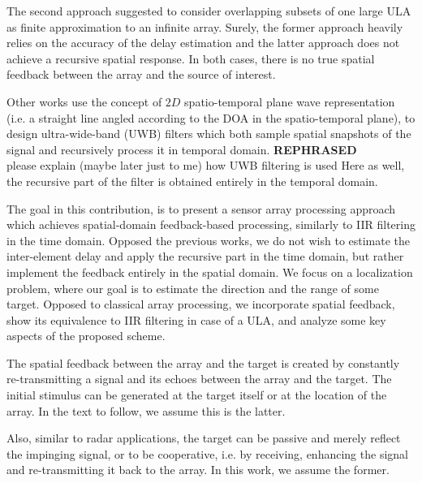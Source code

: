 The second approach suggested to consider overlapping subsets of one large ULA as finite approximation to an infinite array. Surely, the former approach heavily relies on the accuracy of the delay estimation and the latter approach does not achieve a recursive spatial response. In both cases, there is no true spatial feedback between the array and the source of interest.
\par Other works \cite{Madanayake2008AFilters,Madanayake2008ABeamformer} use the concept of $2D$ spatio-temporal plane wave representation (i.e. a straight line angled according to the DOA in the spatio-temporal plane), to design ultra-wide-band (UWB) filters \cite{L.Bruton1983HighlyPlanes} which both sample spatial snapshots of the signal and recursively process it in temporal domain.  {\textbf{REPHRASED}\\please explain (maybe later just to me) how UWB filtering is used}
Here as well, the recursive part of the filter is obtained entirely in the temporal domain.  
\par The goal in this contribution, is to present a sensor array processing approach which achieves spatial-domain feedback-based processing, similarly to IIR filtering in the time domain. Opposed the previous works, we do not wish to estimate the inter-element delay and apply the recursive part in the time domain, but rather implement the feedback entirely in the spatial domain.
We focus on a localization problem, where our goal is to estimate the direction and the range of some target.
Opposed to classical array processing, we incorporate spatial feedback, show its equivalence to IIR filtering in case of a ULA, and analyze some key aspects of the proposed scheme. 

The spatial feedback between the array and the target is created by constantly re-transmitting a signal and its echoes between the array and the target. 
The initial stimulus can be generated at the target itself or at the location of the array. In the text to follow, we assume this is the latter. 

Also, similar to radar applications, the target can be passive and merely reflect the impinging signal, or to be cooperative, i.e. by receiving, enhancing the signal and re-transmitting it back to the array. In this work, we assume the former.

